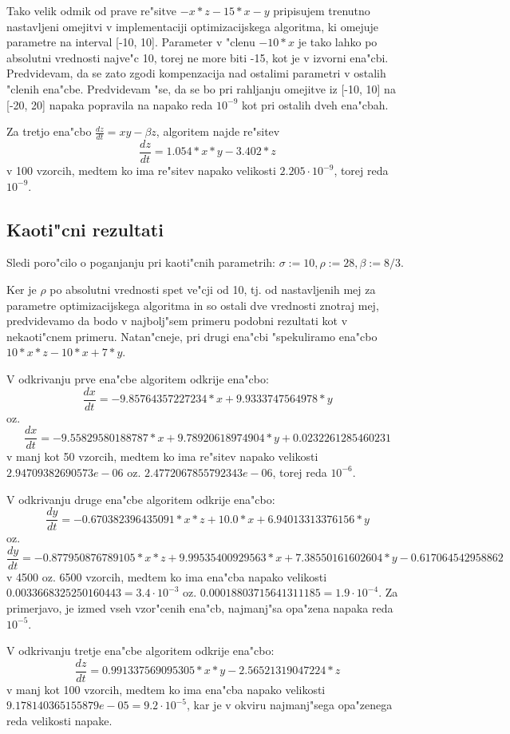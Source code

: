 \documentclass[10pt,a4paper]{article}
\begin{document}
Tako velik odmik od prave re"sitve  
$-x*z-15*x-y$ pripisujem trenutno nastavljeni omejitvi v implementaciji optimizacijskega
algoritma, ki omejuje parametre na interval [-10, 10]. Parameter v "clenu $-10*x$ je tako
lahko po absolutni vrednosti najve"c 10, torej ne more biti -15, kot je v izvorni ena"cbi.
Predvidevam, da se zato zgodi kompenzacija nad ostalimi parametri v ostalih "clenih ena"cbe.
Predvidevam "se, da se bo pri rahljanju omejitve iz [-10, 10] na [-20, 20] napaka popravila
na napako reda $10^{-9}$ kot pri ostalih dveh ena"cbah.

Za tretjo ena"cbo 
$\frac{dz}{dt} = xy - \beta z$,
 algoritem najde re"sitev 
 $$\frac{dz}{dt} = 1.054*x*y - 3.402*z$$
v 100 vzorcih, medtem ko ima re"sitev napako velikosti 
$2.205\cdot 10^{-9}$, torej reda $10^{-9}$.

\subsection{Kaoti"cni rezultati}

Sledi poro"cilo o poganjanju pri kaoti"cnih parametrih:
$\sigma:=10, \rho:=28, \beta:=8/3$.

Ker je $\rho$ po absolutni vrednosti spet ve"cji od 10, tj. od nastavljenih 
mej za parametre optimizacijskega algoritma in so ostali dve vrednosti 
znotraj mej, predvidevamo da bodo v najbolj"sem primeru podobni rezultati kot 
v nekaoti"cnem primeru. Natan"cneje, pri drugi ena"cbi "spekuliramo
ena"cbo $10*x*z -10*x +7*y$.

V odkrivanju prve ena"cbe algoritem odkrije ena"cbo: 
$$\frac{dx}{dt} = -9.85764357227234*x + 9.9333747564978*y$$  
oz. $$\frac{dx}{dt} = -9.55829580188787*x + 9.78920618974904*y + 0.0232261285460231$$
v manj kot 50 vzorcih, medtem ko ima re"sitev napako velikosti
$2.94709382690573e-06$ oz. $2.4772067855792343e-06$, torej reda $10^{-6}$.

V odkrivanju druge ena"cbe algoritem odkrije ena"cbo:
$$ \frac{dy}{dt} = -0.670382396435091*x*z + 10.0*x + 6.94013313376156*y $$
oz. $$ \frac{dy}{dt} = -0.877950876789105*x*z + 9.99535400929563*x + 7.38550161602604*y - 0.617064542958862 $$ 
v 4500 oz. 6500 vzorcih, medtem ko ima ena"cba napako velikosti
$0.0033668325250160443 = 3.4\cdot 10^ {-3}$ oz. $0.00018803715641311185 = 1.9\cdot 10^ {-4}$.
Za primerjavo, je izmed vseh vzor"cenih ena"cb, najmanj"sa opa"zena napaka
reda $10^ {-5}$.

V odkrivanju tretje ena"cbe algoritem odkrije ena"cbo: 
$$\frac{dz}{dt} = 0.991337569095305*x*y - 2.56521319047224*z$$ 
v manj kot 100 vzorcih, medtem ko ima ena"cba napako velikosti
$9.178140365155879e-05 = 9.2\cdot 10^ {-5}$,
kar je v okviru najmanj"sega opa"zenega reda velikosti napake.
\end{document}
